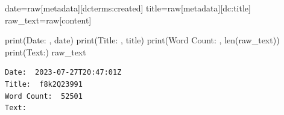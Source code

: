 \documentclass[
  letterpaper,
  DIV=11,
  numbers=noendperiod]{scrreprt}
\newenvironment{Shaded}{\begin{snugshade}}{\end{snugshade}}
\newcommand{\BuiltInTok}[1]{\textcolor[rgb]{0.00,0.23,0.31}{#1}}
\newcommand{\NormalTok}[1]{\textcolor[rgb]{0.00,0.23,0.31}{#1}}
\newcommand{\OperatorTok}[1]{\textcolor[rgb]{0.37,0.37,0.37}{#1}}
\newcommand{\StringTok}[1]{\textcolor[rgb]{0.13,0.47,0.30}{#1}}
\begin{document}
\begin{Shaded}
\begin{Highlighting}[]
\NormalTok{date}\OperatorTok{=}\NormalTok{raw[}\StringTok{\textquotesingle{}metadata\textquotesingle{}}\NormalTok{][}\StringTok{\textquotesingle{}dcterms:created\textquotesingle{}}\NormalTok{]}
\NormalTok{title}\OperatorTok{=}\NormalTok{raw[}\StringTok{\textquotesingle{}metadata\textquotesingle{}}\NormalTok{][}\StringTok{\textquotesingle{}dc:title\textquotesingle{}}\NormalTok{]}
\NormalTok{raw\_text}\OperatorTok{=}\NormalTok{raw[}\StringTok{\textquotesingle{}content\textquotesingle{}}\NormalTok{]}

\BuiltInTok{print}\NormalTok{(}\StringTok{\textquotesingle{}Date: \textquotesingle{}}\NormalTok{, date)}
\BuiltInTok{print}\NormalTok{(}\StringTok{\textquotesingle{}Title: \textquotesingle{}}\NormalTok{, title)}
\BuiltInTok{print}\NormalTok{(}\StringTok{\textquotesingle{}Word Count: \textquotesingle{}}\NormalTok{, }\BuiltInTok{len}\NormalTok{(raw\_text))}
\BuiltInTok{print}\NormalTok{(}\StringTok{\textquotesingle{}Text:\textquotesingle{}}\NormalTok{)}
\NormalTok{raw\_text}
\end{Highlighting}
\end{Shaded}

\begin{verbatim}
Date:  2023-07-27T20:47:01Z
Title:  f8k2Q23991
Word Count:  52501
Text:
\end{verbatim}
\end{document}
